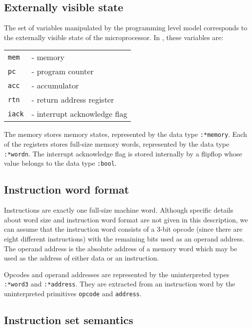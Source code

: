 \subsection{Externally visible state}

The set of variables manipulated by the programming level model
corresponds to the externally visible state of the microprocessor.
In \Tamarack, these variables are:

\begin{center}
\begin{tabular}{ll}
\verb"mem"& - memory\\
\verb"pc"& - program counter\\
\verb"acc"& - accumulator\\
\verb"rtn"& - return address register\\
\verb"iack"& - interrupt acknowledge flag
\end{tabular}
\end{center}

The memory stores memory states, represented by the
data type \verb":*memory".
Each of the registers stores full-size memory words, represented
by the data type \verb":*wordn".
The interrupt acknowledge flag is stored internally by a flipflop whose
value belongs to the data type \verb":bool".

\subsection{Instruction word format}

Instructions are exactly one full-size machine word.
Although specific details about word size and
instruction word format are not given in this description,
we can assume that the instruction word consists of a 3-bit opcode
(since there are eight different instructions)
with the remaining bits used as an operand address.
The operand address
is the absolute address of a memory word
which may be used as the address of either data or an instruction.

\begin{center}

\end{center}

Opcodes and operand addresses
are represented by the uninterpreted types \verb":*word3"
and \verb":*address".
They are extracted from an instruction word by the uninterpreted
primitives \verb"opcode" and \verb"address".

\subsection{Instruction set semantics}
\label{sec-semantics}

